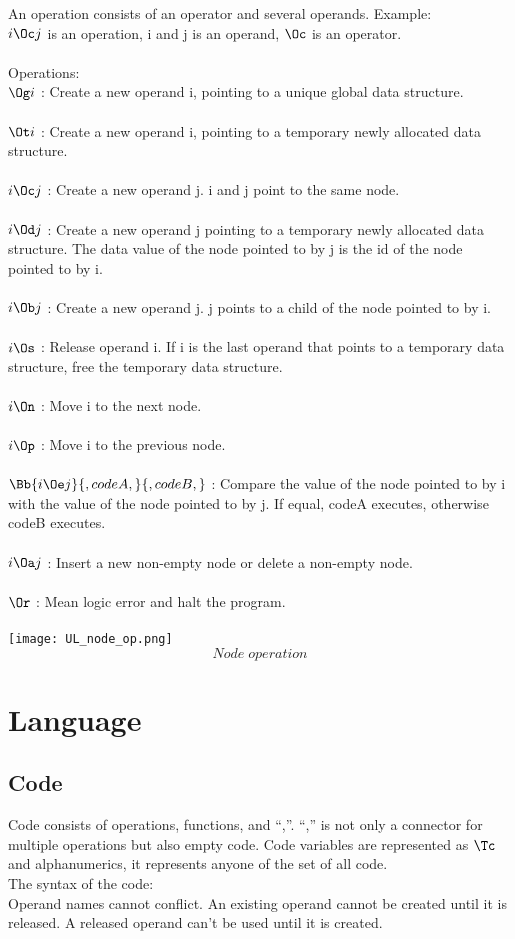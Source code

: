 An operation consists of an operator and several operands. Example:\\
\(i \Oc j\) is an operation, i and j is an operand, \(\Oc\) is an operator.\\\\ 
Operations:\\
\(\Og i \) : Create a new operand i, pointing to a unique global data structure.\\\\
\(\Ot i \) : Create a new operand i, pointing to a temporary newly allocated data structure.\\\\
\(i \Oc j \) : Create a new operand j. i and j point to the same node.\\\\
\(i \Od j \) : Create a new operand j pointing to a temporary newly allocated data structure. The data value of the node pointed to by j is the id of the node pointed to by i.\\\\
\(i \Ob j \) : Create a new operand j. j points to a child of the node pointed to by i.\\\\
\(i \Os \) : Release operand i. If i is the last operand that points to a temporary data structure, free the temporary data structure.\\\\
\(i \On \) : Move i to  the next node.\\\\
\(i \Op \) : Move i to  the previous node.\\\\
\(\Bb{i \Oe j}{,codeA,}{,codeB,} \) : Compare the value of the node pointed to by i with the value of the node pointed to by j. If equal, codeA executes, otherwise codeB executes.\\\\
\(i \Oa j \) : Insert a new non-empty node or delete a non-empty node.\\\\
\( \Or \) : Mean logic error and halt the program.\\\\
\texttt{[image: UL\_node\_op.png]}
\[Node \; operation\]
\bigskip
\section{Language}
\subsection{Code}
	Code  consists of operations, functions, and “,”. “,” is  not only a connector for multiple operations but also   empty code. Code variables are represented as \(\Tc\) and alphanumerics, it represents anyone of the set of all code. \\
 The syntax of the code: \\
	Operand names cannot conflict. An existing operand cannot be created until it is released. A released operand can't be used  until it is created.


